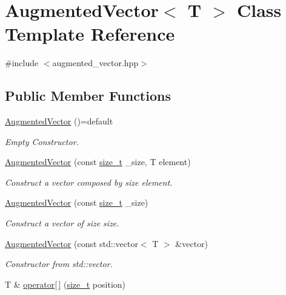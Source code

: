 \hypertarget{classAugmentedVector}{}\section{Augmented\+Vector$<$ T $>$ Class Template Reference}
\label{classAugmentedVector}


{\ttfamily \#include $<$augmented\+\_\+vector.\+hpp$>$}

\subsection*{Public Member Functions}
\begin{DoxyCompactItemize}
\item 
\hyperlink{classAugmentedVector_ad566bd36f4f186f13b1676ede908b445}{Augmented\+Vector} ()=default
\begin{DoxyCompactList}\small\item\em Empty Constructor. \end{DoxyCompactList}\item 
\hyperlink{classAugmentedVector_a308f46c5a85c826800c55b5c2ab375ae}{Augmented\+Vector} (const \hyperlink{tutorial__fpt__2017_2intro_2sixth_2test_8c_a7c94ea6f8948649f8d181ae55911eeaf}{size\+\_\+t} \+\_\+size, T element)
\begin{DoxyCompactList}\small\item\em Construct a vector composed by size element. \end{DoxyCompactList}\item 
\hyperlink{classAugmentedVector_abefeb4bc59b74b09a100593bb4d6a985}{Augmented\+Vector} (const \hyperlink{tutorial__fpt__2017_2intro_2sixth_2test_8c_a7c94ea6f8948649f8d181ae55911eeaf}{size\+\_\+t} \+\_\+size)
\begin{DoxyCompactList}\small\item\em Construct a vector of size size. \end{DoxyCompactList}\item 
\hyperlink{classAugmentedVector_aa8878191d740720303ba47ee5ea9a578}{Augmented\+Vector} (const std\+::vector$<$ T $>$ \&vector)
\begin{DoxyCompactList}\small\item\em Constructor from std\+::vector. \end{DoxyCompactList}\item 
T \& \hyperlink{classAugmentedVector_a2a7ea60bb1f83ef00512368c4a929dd9}{operator\mbox{[}$\,$\mbox{]}} (\hyperlink{tutorial__fpt__2017_2intro_2sixth_2test_8c_a7c94ea6f8948649f8d181ae55911eeaf}{size\+\_\+t} position)

\end{DoxyCompactItemize}
